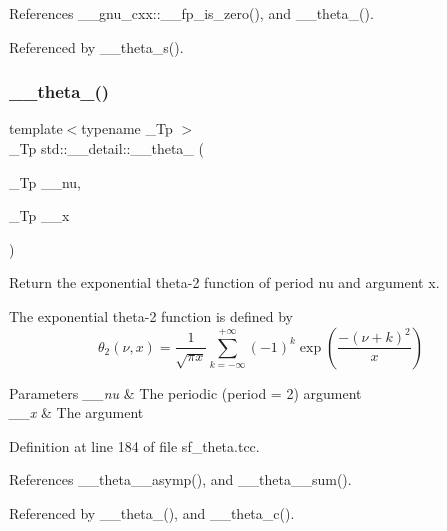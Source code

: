 References \+\_\+\+\_\+gnu\+\_\+cxx\+::\+\_\+\+\_\+fp\+\_\+is\+\_\+zero(), and \+\_\+\+\_\+theta\+\_().



Referenced by \+\_\+\+\_\+theta\+\_\+s().

\mbox{\label{namespacestd_1_1____detail_ae783991fe49b94dff4ac9e3ebb446d4f}} 
\subsubsection{\texorpdfstring{\+\_\+\+\_\+theta\+\_()}{\_\_theta\_2()}}
{\footnotesize\ttfamily template$<$typename \+\_\+\+Tp $>$ \\
\+\_\+\+Tp std\+::\+\_\+\+\_\+detail\+::\+\_\+\+\_\+theta\+\_ (\begin{DoxyParamCaption}\item[{\+\_\+\+Tp}]{\+\_\+\+\_\+nu,  }\item[{\+\_\+\+Tp}]{\+\_\+\+\_\+x }\end{DoxyParamCaption})}

Return the exponential theta-\/2 function of period {\ttfamily nu} and argument {\ttfamily x}.

The exponential theta-\/2 function is defined by \[ \theta_2(\nu,x) = \frac{1}{\sqrt{\pi x}} \sum_{k=-\infty}^{+\infty} (-1)^k \exp\left( \frac{-(\nu + k)^2}{x} \right) \]


\begin{DoxyParams}{Parameters}
{\em \+\_\+\+\_\+nu} & The periodic (period = 2) argument \\
\hline
{\em \+\_\+\+\_\+x} & The argument \\
\hline
\end{DoxyParams}


Definition at line 184 of file sf\+\_\+theta.\+tcc.



References \+\_\+\+\_\+theta\+\_\+\_\+asymp(), and \+\_\+\+\_\+theta\+\_\+\_\+sum().



Referenced by \+\_\+\+\_\+theta\+\_(), and \+\_\+\+\_\+theta\+\_\+c().

\mbox{\label{namespacestd_1_1____detail_ac7207ce23916e29df96b3b2159b55150}} 
